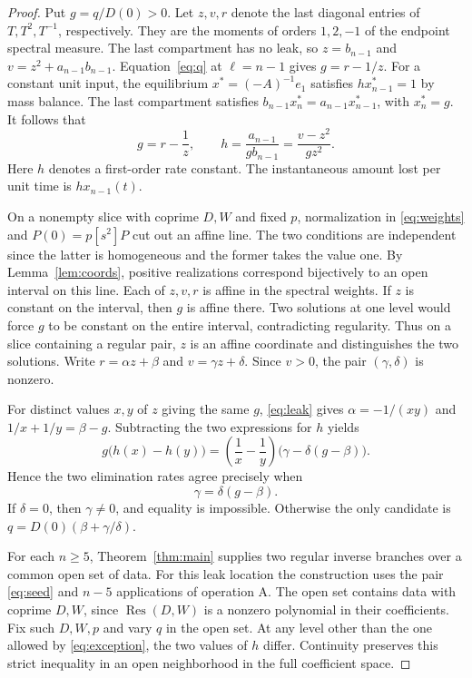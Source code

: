\documentclass[11pt,a4paper]{article}
\newcommand{\Res}{\operatorname{Res}}
\begin{document}
\begin{proof}
Put \(g=q/D(0)>0\). Let \(z,v,r\) denote the last diagonal entries of
\(T,T^2,T^{-1}\), respectively. They are the moments of orders \(1,2,-1\)
of the endpoint spectral measure. The last compartment has no leak, so
\(z=b_{n-1}\) and \(v=z^2+a_{n-1}b_{n-1}\).
Equation~\eqref{eq:q} at \(\ell=n-1\) gives \(g=r-1/z\).
For a constant unit input, the equilibrium \(x^*=(-A)^{-1}e_1\) satisfies
\(h x^*_{n-1}=1\) by mass balance. The last compartment satisfies
\(b_{n-1}x^*_n=a_{n-1}x^*_{n-1}\), with \(x^*_n=g\). It follows that
\begin{equation}\label{eq:leak}
 g=r-\frac1z,\qquad h=\frac{a_{n-1}}{g b_{n-1}}
                    =\frac{v-z^2}{g z^2}.
\end{equation}
Here \(h\) denotes a first-order rate constant. The instantaneous amount lost
per unit time is \(h x_{n-1}(t)\).

On a nonempty slice with coprime \(D,W\) and fixed \(p\), normalization in
\eqref{eq:weights} and \(P(0)=p[s^2]P\) cut out an affine line. The two
conditions are independent since the latter is homogeneous and the former
takes the value one. By Lemma~\ref{lem:coords}, positive realizations
correspond bijectively to an open interval on this line. Each of \(z,v,r\)
is affine in the spectral weights. If \(z\) is constant on the interval,
then \(g\) is affine there. Two solutions at one level would force \(g\) to
be constant on the entire interval, contradicting regularity. Thus on a slice
containing a regular pair, \(z\) is an affine coordinate and distinguishes
the two solutions. Write \(r=\alpha z+\beta\) and \(v=\gamma z+\delta\).
Since \(v>0\), the pair \((\gamma,\delta)\) is nonzero.

For distinct values \(x,y\) of \(z\) giving the same \(g\),
\eqref{eq:leak} gives \(\alpha=-1/(xy)\) and
\(1/x+1/y=\beta-g\). Subtracting the two expressions for \(h\) yields
\[
 g\bigl(h(x)-h(y)\bigr)
 =\left(\frac1x-\frac1y\right)\bigl(\gamma-\delta(g-\beta)\bigr).
\]
Hence the two elimination rates agree precisely when
\begin{equation}\label{eq:exception}
 \gamma=\delta(g-\beta).
\end{equation}
If \(\delta=0\), then \(\gamma\ne0\), and equality is impossible. Otherwise
the only candidate is \(q=D(0)(\beta+\gamma/\delta)\).

For each \(n\ge5\), Theorem~\ref{thm:main} supplies two regular inverse
branches over a common open set of data. For this leak location the
construction uses the pair \eqref{eq:seed} and \(n-5\) applications of
operation A. The open set contains data with coprime \(D,W\), since
\(\Res(D,W)\) is a nonzero polynomial in their coefficients. Fix such
\(D,W,p\) and vary \(q\) in the open set. At any level other than the one
allowed by \eqref{eq:exception}, the two values of \(h\) differ.
Continuity preserves this strict inequality in an open neighborhood
in the full coefficient space.


\end{proof}
\end{document}
